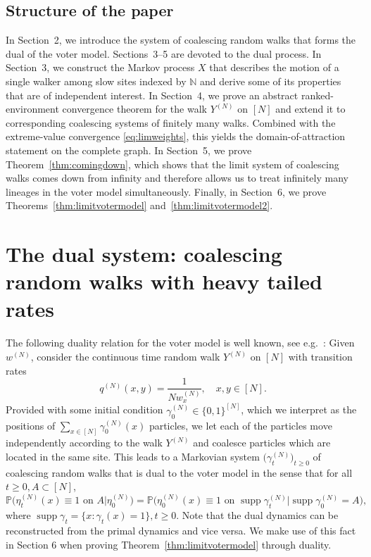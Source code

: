 \documentclass[11pt,a4paper]{scrartcl}
\numberwithin{equation}{section}
\theoremstyle{plain}
\theoremstyle{definition}
\theoremstyle{remark}
\DeclareMathOperator{\supp}{supp}
\newcommand{\bN}{\ensuremath{\mathbb{N}}}
\newcommand{\bP}{\ensuremath{\mathbb{P}}}
\begin{document}
\subsection*{Structure of the paper}
In Section~2, we introduce the system of coalescing random walks that forms the dual of the voter model. Sections~3--5 are devoted to the dual process. In Section~3, we construct the Markov process $X$ that describes the motion of a single walker among slow sites indexed by $\bN$ and derive some of its properties that are of independent interest. In Section~4, we prove an abstract ranked-environment convergence theorem for the walk $Y^{(N)}$ on $[N]$ and extend it to corresponding coalescing systems of finitely many walks. Combined with the extreme-value convergence \eqref{eq:limweights}, this yields the domain-of-attraction statement on the complete graph. In Section~5, we prove Theorem~\ref{thm:comingdown}, which shows that the limit system of coalescing walks comes down from infinity and therefore allows us to treat infinitely many lineages in the voter model simultaneously. Finally, in Section~6, we prove Theorems~\ref{thm:limitvotermodel} and~\ref{thm:limitvotermodel2}.

\section{The dual system: coalescing random walks with heavy tailed rates}
The following duality relation for the voter model is well known, see e.g.\ \cite[Chapter V]{Liggett85}: Given $w^{(N)}$, consider the continuous time random walk $Y^{(N)}$ on $[N]$ with transition rates
$$
q^{(N)}(x,y)=\frac{1}{Nw^{(N)}_x}, \quad x,y\in[N].
$$
Provided with some initial condition $\gamma_0^{(N)}\in \{0,1\}^{[N]}$, which we interpret as the positions of $\sum_{x\in[N]}\gamma^{(N)}_0(x)$ particles, we let each of the particles move independently according to the walk $Y^{(N)}$ and coalesce particles which are located in the same site. This leads to a Markovian system $\big(\gamma_t^{(N)}\big)_{t\geq 0}$ of coalescing random walks that is dual to the voter model in the sense that for all $t\geq 0, A\subset[N]$,
\begin{equation}\label{eq:duality}
\bP\big(\eta^{(N)}_t(x)\equiv 1 \text{ on }A\big| \eta^{(N)}_0\big)=\bP\big(\eta^{(N)}_0(x)\equiv 1 \text{ on }\supp \gamma^{(N)}_t\big| \supp \gamma^{(N)}_0 = A\big),
\end{equation}
where $\supp \gamma_t=\{x:\gamma_t(x)=1\}, t\geq 0.$ Note that the dual dynamics can be reconstructed from the primal dynamics and vice versa. We make use of this fact in Section 6 when proving Theorem~\ref{thm:limitvotermodel} through duality.
\end{document}
